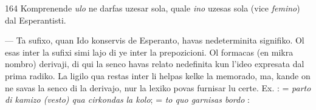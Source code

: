 \begin{VUpage}[168]{164}
Komprenende \textit{ulo} ne darfas uzesar sola, quale \textit{ino} uzesas\nl
sola (vice \textit{femino}) dal Esperantisti.

 --- Ta sufixo, quan Ido konservis de Esperanto,\nl
havas nedeterminita signifiko. Ol esas inter la sufixi simi\cc
lajo di ye inter la prepozicioni. Ol formacas (en mikra\nl
nombro) derivaji, di qui la senco havas relato nedefinita\nl
kun l'ideo expresata dal prima radiko. La ligilo qua restas\nl
inter li helpas kelke la memorado, ma, kande on ne savas\nl
la senco di la derivajo, nur la lexiko povas furnisar lu\nl
certe. Ex. :  = \textit{parto di kamizo (vesto) qua cirkondas}\nl
\textit{la kolo};  = \textit{to quo garnisas bordo} : \parplein
\end{VUpage}

